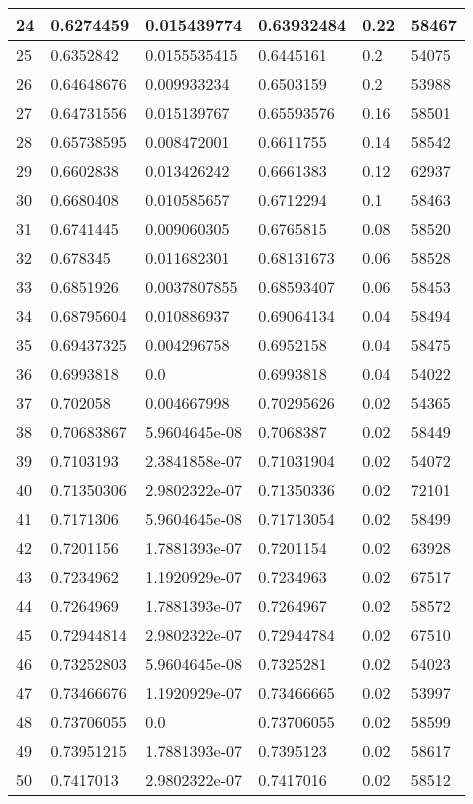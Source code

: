\begin{longtable}{|l|l|l|l|l|l|}
24 & 0.6274459 & 0.015439774 & 0.63932484 & 0.22 & 58467 \\ \hline 
25 & 0.6352842 & 0.0155535415 & 0.6445161 & 0.2 & 54075 \\ \hline 
26 & 0.64648676 & 0.009933234 & 0.6503159 & 0.2 & 53988 \\ \hline 
27 & 0.64731556 & 0.015139767 & 0.65593576 & 0.16 & 58501 \\ \hline 
28 & 0.65738595 & 0.008472001 & 0.6611755 & 0.14 & 58542 \\ \hline 
29 & 0.6602838 & 0.013426242 & 0.6661383 & 0.12 & 62937 \\ \hline 
30 & 0.6680408 & 0.010585657 & 0.6712294 & 0.1 & 58463 \\ \hline 
31 & 0.6741445 & 0.009060305 & 0.6765815 & 0.08 & 58520 \\ \hline 
32 & 0.678345 & 0.011682301 & 0.68131673 & 0.06 & 58528 \\ \hline 
33 & 0.6851926 & 0.0037807855 & 0.68593407 & 0.06 & 58453 \\ \hline 
34 & 0.68795604 & 0.010886937 & 0.69064134 & 0.04 & 58494 \\ \hline 
35 & 0.69437325 & 0.004296758 & 0.6952158 & 0.04 & 58475 \\ \hline 
36 & 0.6993818 & 0.0 & 0.6993818 & 0.04 & 54022 \\ \hline 
37 & 0.702058 & 0.004667998 & 0.70295626 & 0.02 & 54365 \\ \hline 
38 & 0.70683867 & 5.9604645e-08 & 0.7068387 & 0.02 & 58449 \\ \hline 
39 & 0.7103193 & 2.3841858e-07 & 0.71031904 & 0.02 & 54072 \\ \hline 
40 & 0.71350306 & 2.9802322e-07 & 0.71350336 & 0.02 & 72101 \\ \hline 
41 & 0.7171306 & 5.9604645e-08 & 0.71713054 & 0.02 & 58499 \\ \hline 
42 & 0.7201156 & 1.7881393e-07 & 0.7201154 & 0.02 & 63928 \\ \hline 
43 & 0.7234962 & 1.1920929e-07 & 0.7234963 & 0.02 & 67517 \\ \hline 
44 & 0.7264969 & 1.7881393e-07 & 0.7264967 & 0.02 & 58572 \\ \hline 
45 & 0.72944814 & 2.9802322e-07 & 0.72944784 & 0.02 & 67510 \\ \hline 
46 & 0.73252803 & 5.9604645e-08 & 0.7325281 & 0.02 & 54023 \\ \hline 
47 & 0.73466676 & 1.1920929e-07 & 0.73466665 & 0.02 & 53997 \\ \hline 
48 & 0.73706055 & 0.0 & 0.73706055 & 0.02 & 58599 \\ \hline 
49 & 0.73951215 & 1.7881393e-07 & 0.7395123 & 0.02 & 58617 \\ \hline 
50 & 0.7417013 & 2.9802322e-07 & 0.7417016 & 0.02 & 58512 \\ \hline 
\end{longtable}